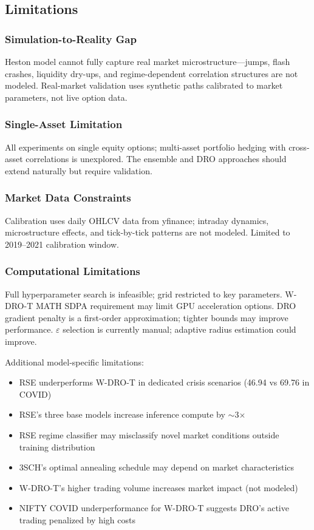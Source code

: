 \subsection{Limitations}
\label{sec:limitations}

\subsubsection{Simulation-to-Reality Gap}

Heston model cannot fully capture real market microstructure---jumps, flash crashes, liquidity dry-ups, and regime-dependent correlation structures are not modeled. Real-market validation uses synthetic paths calibrated to market parameters, not live option data.

\subsubsection{Single-Asset Limitation}

All experiments on single equity options; multi-asset portfolio hedging with cross-asset correlations is unexplored. The ensemble and DRO approaches should extend naturally but require validation.

\subsubsection{Market Data Constraints}

Calibration uses daily OHLCV data from yfinance; intraday dynamics, microstructure effects, and tick-by-tick patterns are not modeled. Limited to 2019--2021 calibration window.

\subsubsection{Computational Limitations}

Full hyperparameter search is infeasible; grid restricted to key parameters. W-DRO-T MATH SDPA requirement may limit GPU acceleration options. DRO gradient penalty is a first-order approximation; tighter bounds may improve performance. $\varepsilon$ selection is currently manual; adaptive radius estimation could improve.

Additional model-specific limitations:
\begin{itemize}[noitemsep]
    \item RSE underperforms W-DRO-T in dedicated crisis scenarios (46.94 vs 69.76 in COVID)
    \item RSE's three base models increase inference compute by $\sim$3$\times$
    \item RSE regime classifier may misclassify novel market conditions outside training distribution
    \item 3SCH's optimal annealing schedule may depend on market characteristics
    \item W-DRO-T's higher trading volume increases market impact (not modeled)
    \item NIFTY COVID underperformance for W-DRO-T suggests DRO's active trading penalized by high costs
\end{itemize}

